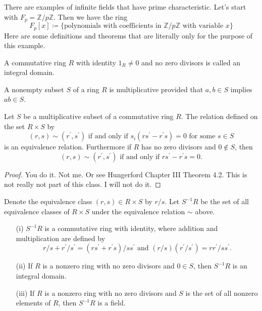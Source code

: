 \begin{eg}
    There are examples of infinite fields that have prime characteristic. Let's start with \(F_p = \mathbb{Z} /p\mathbb{Z} \). Then we have the ring
    \[
        F_p[x] \coloneqq \{ \text{polynomials with coefficients in } \mathbb{Z} /p\mathbb{Z} \text{ with variable } x \} 
    \]
	Here are some definitions and theorems that are literally only for the purpose of this example.
	\begin{definition}
		A commutative ring \(R\) with identity \(1_R \neq 0\) and no zero divisors is called an integral domain.
	\end{definition}
	\begin{definition}[{[Hungerford]}]
		A nonempty subset \(S\) of a ring \(R\) is multiplicative provided that \(a,b \in S\) implies \(ab \in S\).    
	\end{definition}
	\begin{theorem}[{[Hungerford]}]
		Let \(S\) be a multiplicative subset of a commutative ring \(R\). The relation defined on the set \(R\times S\) by
		\[
			(r,s) \sim (r^{\prime} ,s^{\prime} ) \text{ if and only if } s_i (rs^{\prime} -r^{\prime} s)=0 \text{ for some } s \in S  
		\]
		is an equivalence relation. Furthermore if \(R\) has no zero divisors and \(0 \notin S\), then
		\[
			(r,s) \sim (r^{\prime} ,s^{\prime} ) \text{ if and only if } rs^{\prime} -r^{\prime} s=0. 
		\] 
	\end{theorem}
	\begin{proof}
		You do it. Not me. Or see Hungerford Chapter III Theorem 4.2. This is not really not part of this class. I will not do it.
	\end{proof}
	\begin{theorem}[{[Hungerford]}]
		Denote the equivalence class \((r,s) \in R\times S\) by \(r/s\). Let \(S^{-1} R\) be the set of all equivalence classes of \(R\times S\) under the equivalence relation \(\sim \) above.
		\begin{itemize}
			\item[(i)] \(S^{-1} R\) is a commutative ring with identity, where addition and multiplication are defined by 
			\[
				r/s + r^{\prime} /s^{\prime}  = (rs^{\prime} +r^{\prime} s)/ss^{\prime} \text{ and } (r/s)(r^{\prime} /s^{\prime} ) = rr^{\prime} /ss^{\prime} . 
			\]
			\item[(ii)] If \(R\) is a nonzero ring with no zero divisors and \(0 \in S\), then \(S^{-1} R\) is an integral domain.   
			\item[(iii)] If \(R\) is a nonzero ring with no zero divisors and \(S\) is the set of all nonzero elements of \(R\), then \(S^{-1} R\) is a field.    

\end{itemize}
\end{theorem}
\end{eg}
